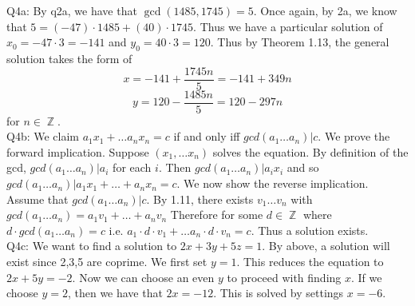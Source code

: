 \documentclass[letterpaper]{article}
\DeclareMathOperator{\Z}{\mathbb{Z}}
\begin{document}
\noindent Q4a: By q2a, we have that $\gcd(1485,1745) = 5$. Once again, by 2a, we know that $5= (-47)\cdot 1485 + (40)\cdot 1745$. 
Thus we have a particular solution of $x_0 = - 47 \cdot 3 = -141$ and $y_0 = 40 \cdot 3=120$. Thus by Theorem 1.13, the general solution takes the form of $$x= -141 + \frac{1745n}{5} = -141 + 349n$$  $$y = 120 - \frac{1485n}{5}= 120-297n$$ for $n\in \Z$. 
\newline \\ Q4b: We claim $a_1x_1 + \dots a_n x_n = c$ if and only iff $gcd(a_1\dots a_n)|c$. We prove the forward implication.  Suppose $(x_1,\dots x_n)$ solves the equation. By definition of the gcd, $gcd(a_1\dots a_n)|a_i$ for each $i$. Then $gcd(a_1\dots a_n)|a_ix_i$ and so $gcd(a_1\dots a_n)|a_1x_1 + \dots + a_n x_n=c$. We now show the reverse implication. Assume that $gcd(a_1\dots a_n)|c$. By 1.11, there exists $v_1\dots v_n$ with $gcd(a_1\dots a_n) = a_1 v_1 + \dots + a_n v_n$ 
Therefore for some $d\in \Z$ where $d\cdot gcd(a_1\dots a_n) = c$ i.e. $a_1\cdot d\cdot v_1 + \dots a_n \cdot d \cdot v_n = c$. Thus a solution exists. 
\newline \\ Q4c: We want to find a solution to $2x+3y+5z=1$. By above, a solution will exist since 2,3,5 are coprime. We first set $y=1$. This reduces the equation to $2x+5y=-2$. Now we can choose an even $y$ to proceed with finding $x$. If we choose $y=2$, then we have that $2x=-12$. This is solved by settings $x=-6$.
\end{document}

